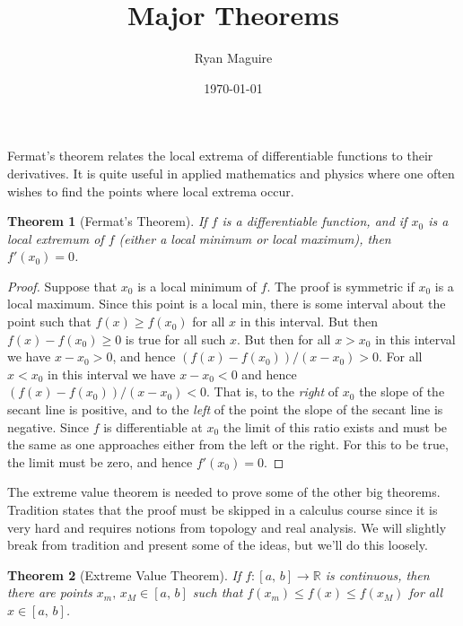 \documentclass{article}
\title{Major Theorems}
\author{Ryan Maguire}
\date{\today}
\theoremstyle{plain}
\newtheorem{theorem}{Theorem}
\begin{document}
    \maketitle
    Fermat's theorem relates the local extrema of differentiable functions to
    their derivatives. It is quite useful in applied mathematics and physics
    where one often wishes to find the points where local extrema occur.
    \begin{theorem}[Fermat's Theorem]
        If $f$ is a differentiable function, and if $x_{0}$ is a local extremum
        of $f$ (either a local minimum or local maximum), then $f'(x_{0})=0$.
    \end{theorem}
    \begin{proof}
        Suppose that $x_{0}$ is a local minimum of $f$. The proof is symmetric
        if $x_{0}$ is a local maximum. Since this point is a local min, there
        is some interval about the point such that $f(x)\geq{f}(x_{0})$ for all
        $x$ in this interval. But then $f(x)-f(x_{0})\geq{0}$ is true for all
        such $x$. But then for all $x>x_{0}$ in this interval we have
        $x-x_{0}>0$, and hence $(f(x)-f(x_{0}))/(x-x_{0})>0$. For all
        $x<x_{0}$ in this interval we have $x-x_{0}<0$ and hence
        $(f(x)-f(x_{0}))/(x-x_{0})<0$. That is, to the \textit{right} of
        $x_{0}$ the slope of the secant line is positive, and to the
        \textit{left} of the point the slope of the secant line is negative.
        Since $f$ is differentiable at $x_{0}$ the limit of this ratio exists
        and must be the same as one approaches either from the left or the
        right. For this to be true, the limit must be zero, and hence
        $f'(x_{0})=0$.
    \end{proof}
    The extreme value theorem is needed to prove some of the other big theorems.
    Tradition states that the proof must be skipped in a calculus course since
    it is very hard and requires notions from topology and real analysis. We
    will slightly break from tradition and present some of the ideas, but we'll
    do this loosely.
    \begin{theorem}[Extreme Value Theorem]
        If $f:[a,\,b]\rightarrow\mathbb{R}$ is continuous, then there are points
        $x_{m},\,x_{M}\in[a,\,b]$ such that
        $f(x_{m})\leq{f}(x)\leq{f}(x_{M})$ for all $x\in[a,\,b]$.
    \end{theorem}
\end{document}

